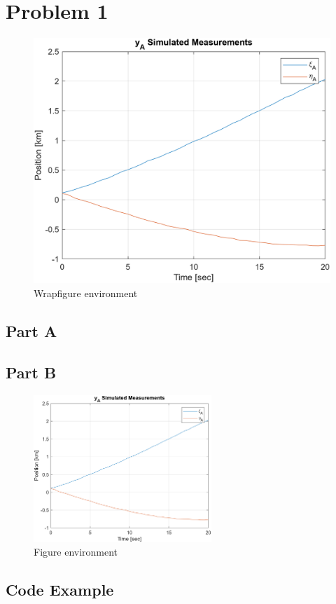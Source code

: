 
\section{Problem 1}
%
\begin{figure}
    \begin{center}
        \includegraphics[width=0.8\linewidth]{figs/p2pa.png}
    \end{center}
    \caption{Wrapfigure environment}
\end{figure}
%
\lipsum[26]
\lipsum[55]
%
\subsection{Part A}
\begin{remark}[test]
    \lipsum[55]
\end{remark}
%
\lipsum[23]
%
\begin{definition}[test]
    \lipsum[44]
\end{definition}
%
\lipsum[32]
%
\subsection{Part B}
%
\begin{figure}[h!tbp]
    \centering
    \includegraphics[width=0.6\textwidth]{figs/p2pa.png}
    \caption{Figure environment}
    \label{fig:p2_a}
\end{figure}
%
\begin{theorem}[test]
    \lipsum[2]
\end{theorem}
%
\lipsum[34]
%
\begin{eg}[test]
    \lipsum[36]
\end{eg}
%
\subsection{Code Example}
\inputminted{python3}{code/code_ex.py}